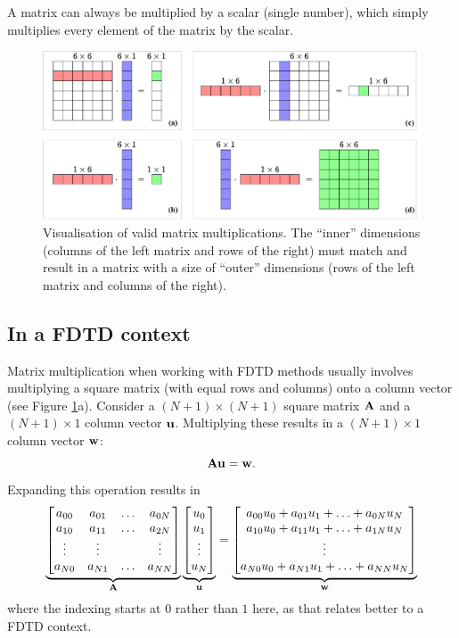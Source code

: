 A matrix can always be multiplied by a scalar (single number), which simply multiplies every element of the matrix by the scalar. 
\begin{figure}[h]
    \includegraphics[width=\textwidth]{figures/analysis/matrixVector.pdf}
    \caption{Visualisation of valid matrix multiplications. The ``inner'' dimensions (columns of the left matrix and rows of the right) must match and result in a matrix with a size of ``outer'' dimensions (rows of the left matrix and columns of the right). \label{fig:matrixVector}}
\end{figure}

\subsection{In a FDTD context}
Matrix multiplication when working with FDTD methods usually involves multiplying a square matrix (with equal rows and columns) onto a column vector (see Figure \ref{fig:matrixVector}a). Consider a $(N+1)\times (N+1)$ square matrix $\mathbf{A}$ and a $(N+1) \times 1$ column vector $\mathbf{u}$. Multiplying these results in a $(N+1) \times 1$ column vector $\mathbf{w}$:
\begin{equation}
    \mathbf{A}\mathbf{u} = \mathbf{w}.
\end{equation}
Expanding this operation results in
\begin{equation}
    \underbrace{\begin{bmatrix}
        a_{00} & a_{01} & \hdots & a_{0N}\\
        a_{10} & a_{11} & \hdots & a_{2N}\\
        \vdots & \vdots & &\vdots\\
        a_{N0} & a_{N1} & \hdots & a_{NN}
    \end{bmatrix}}_{\mathbf{A}}
    \underbrace{\begin{bmatrix}
        u_0\\
        u_1\\
        \vdots\\
        u_N
    \end{bmatrix}}_{\mathbf{u}} = 
    \underbrace{\begin{bmatrix}
        a_{00}u_0 + a_{01}u_1 + \hdots + a_{0N}u_N\\
        a_{10}u_0 + a_{11}u_1 + \hdots + a_{1N}u_N\\
        \vdots\\
        a_{N0}u_0 + a_{N1}u_1 + \hdots + a_{NN}u_N
    \end{bmatrix}}_{\mathbf{w}}
\end{equation}
where the indexing starts at $0$ rather than $1$ here, as that relates better to a FDTD context.

